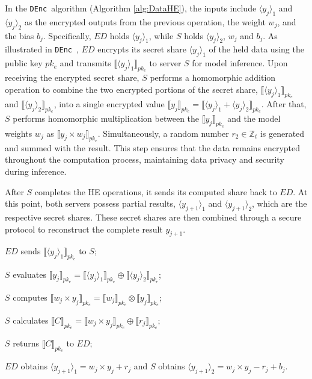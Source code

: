 \documentclass[conference]{IEEEtran}
\newcommand{\DEnc}{\texttt{DEnc}}
\begin{document}
In the \DEnc~algorithm (Algorithm \ref{alg:DataHE}), the inputs include $\langle y_j\rangle_1$ and $\langle  y_j\rangle_2$ as the encrypted outputs from the previous operation, the weight $w_j$, and the bias $b_j$. Specifically, $ED$ holds $\langle y_j\rangle_1$, while $S$ holds $\langle y_j\rangle_2$, $w_j$ and $b_j$. As illustrated in \DEnc~, $ED$ encrypts its secret share $\langle y_j \rangle_1$ of the held data using the public key $pk_e$ and transmits $\llbracket\langle y_j \rangle_1\rrbracket_{pk_e}$ to server $S$ for model inference. Upon receiving the encrypted secret share, $S$ performs a homomorphic addition operation to combine the two encrypted portions of the secret share, $\llbracket\langle y_j \rangle_1\rrbracket_{pk_e}$ and $\llbracket\langle y_j \rangle_2\rrbracket_{pk_e}$, into a single encrypted value $\llbracket y_j \rrbracket_{pk_e}=\llbracket \langle y_j \rangle_1 +  \langle y_j \rangle_2\rrbracket_{pk_e}$. After that, $S$ performs homomorphic multiplication between the $\llbracket y_j \rrbracket_{pk_e}$ and the model weights $w_j$ as $\llbracket y_j\times w_j \rrbracket_{pk_e}$. Simultaneously, a random number $r_2 \in \mathbb{Z}_t$ is generated and summed with the result. This step ensures that the data remains encrypted throughout the computation process, maintaining data privacy and security during inference.
 
After $S$ completes the HE operations, it sends its computed share back to $ED$. At this point, both servers possess partial results, $\langle y_{j+1} \rangle_1$ and $\langle y_{j+1} \rangle_2$, which are the respective secret shares. These secret shares are then combined through a secure protocol to reconstruct the complete result $y_{j+1}$.
\begin{algorithm}[htbp]
	\caption{\DEnc$(\langle y_j \rangle_1,\langle y_j \rangle_2,w_{j},b_{j}) \rightarrow (\langle y_{j+1}\rangle_1,\langle y_{j+1}\rangle_2)$\!\!\!\!\!}
    \label{alg:DataHE}
    \LinesNumbered
    $ED$ sends $\llbracket\langle y_j \rangle_1\rrbracket_{pk_e}$ to $S$;
    
    $S$ evaluates $\llbracket y_j \rrbracket_{pk_e} = \llbracket \langle y_j \rangle_1 \rrbracket_{pk_e}  \oplus  \llbracket\langle y_j\rangle_2\rrbracket_{pk_e}$;
    
    $S$ computes $\llbracket w_{j} \times y_j \rrbracket_{pk_e} = \llbracket w_{j} \rrbracket_{pk_e} \otimes \llbracket  y_{j} \rrbracket_{pk_e}$;
    
    $S$ calculates $\llbracket C \rrbracket_{pk_e} = \llbracket w_{j} \times y_{j} \rrbracket_{pk_e} \oplus \llbracket r_{j} \rrbracket_{pk_e}$;
    
    $S$ returns $\llbracket C \rrbracket_{pk_e}$ to $ED$;
    
    $ED$ obtains $\langle y_{j+1}\rangle_1=w_{j} \times y_{j}+r_{j}$ and $S$ obtains $\langle y_{j+1} \rangle_2 = w_j \times y_{j}-r_j+b_j$.
\end{algorithm}
\end{document}
